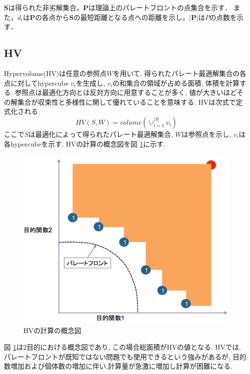 \documentclass[11pt,a4j,notitlepage]{jreport}
\begin{document}
$\bm S$は得られた非劣解集合，$\bm P$は理論上のパレートフロントの点集合を示す．
また，$d_i$は$\bm P$の各点から$\bm S$の最短距離となる点への距離を示し，$|\bm P|$は$P$の点数を示す．





\subsection{HV}
Hypervolume(HV)は任意の参照点$W$を用いて, 得られたパレート最適解集合の各点に対してhypercube $v_i$を生成し, $v_i$の和集合の領域が占める面積, 体積を計算する.
参照点は最適化方向とは反対方向に用意することが多く, 値が大きいほどその解集合が収束性と多様性に関して優れていることを意味する.
HVは次式で定式化される.
\begin{equation}
HV(S,W)=volume(\cup_{i=1}^{|S|} v_i) \label{eq:hv}
\end{equation}
ここで$S$は最適化によって得られたパレート最適解集合, $W$は参照点を示し, $v_i$は各hypercubeを示す.
HVの計算の概念図を図 \ref{fig:hvimg}に示す.
\begin{figure}[htbp]
  \begin{center}
    \includegraphics[width=0.7\linewidth]{img/HVimg.png}
                \setlength{\abovecaptionskip}{0mm}
    \setlength{\belowcaptionskip}{0mm}
      \caption{HVの計算の概念図}
  \label{fig:hvimg}
  \end{center}
\end{figure}

図 \ref{fig:hvimg}は2目的における概念図であり, この場合総面積がHVの値となる.
HVでは, パレートフロントが既知ではない問題でも使用できるという強みがあるが, 目的数増加および個体数の増加に伴い,計算量が急激に増加し計算が困難になる.
\end{document}
